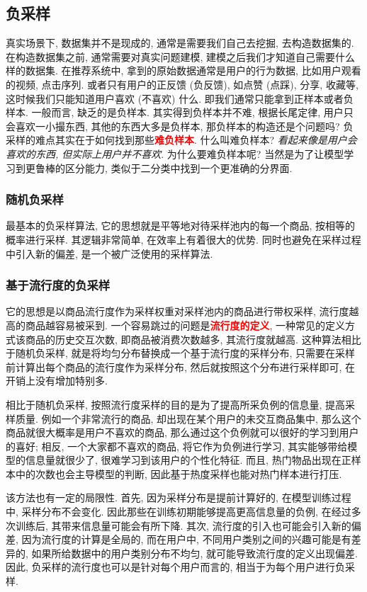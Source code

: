 \subsection{负采样}
真实场景下, 数据集并不是现成的, 通常是需要我们自己去挖掘, 去构造数据集的. 在构造数据集之前, 通常需要对真实问题建模, 建模之后我们才知道自己需要什么样的数据集. 在推荐系统中, 拿到的原始数据通常是用户的行为数据, 比如用户观看的视频, 点击序列. 或者只有用户的正反馈 (负反馈), 如点赞 (点踩), 分享, 收藏等, 这时候我们只能知道用户喜欢 (不喜欢) 什么. 即我们通常只能拿到正样本或者负样本. 一般而言, 缺乏的是负样本. 其实得到负样本并不难, 根据长尾定律, 用户只会喜欢一小撮东西, 其他的东西大多是负样本, 那负样本的构造还是个问题吗? 负采样的难点其实在于如何找到那些\textcolor{red}{\textbf{难负样本}}. 什么叫难负样本? \textit{看起来像是用户会喜欢的东西, 但实际上用户并不喜欢}. 为什么要难负样本呢? 当然是为了让模型学习到更鲁棒的区分能力, 类似于二分类中找到一个更准确的分界面.

\subsubsection{随机负采样}
最基本的负采样算法, 它的思想就是平等地对待采样池内的每一个商品, 按相等的概率进行采样. 其逻辑非常简单, 在效率上有着很大的优势. 同时也避免在采样过程中引入新的偏差, 是一个被广泛使用的采样算法. 

\subsubsection{基于流行度的负采样}
它的思想是以商品流行度作为采样权重对采样池内的商品进行带权采样, 流行度越高的商品越容易被采到. 一个容易跳过的问题是\textcolor{red}{\textbf{流行度的定义}}, 一种常见的定义方式该商品的历史交互次数, 即商品被消费次数越多, 其流行度就越高. 这种算法相比于随机负采样, 就是将均匀分布替换成一个基于流行度的采样分布, 只需要在采样前计算出每个商品的流行度作为采样分布, 然后就按照这个分布进行采样即可, 在开销上没有增加特别多.
 
相比于随机负采样, 按照流行度采样的目的是为了提高所采负例的信息量, 提高采样质量. 例如一个非常流行的商品, 却出现在某个用户的未交互商品集中, 那么这个商品就很大概率是用户不喜欢的商品, 那么通过这个负例就可以很好的学习到用户的喜好; 相反, 一个大家都不喜欢的商品, 将它作为负例进行学习, 其实能够带给模型的信息量就很少了, 很难学习到该用户的个性化特征. 而且, 热门物品出现在正样本中的次数也会主导模型的判断, 因此基于热度采样也能对热门样本进行打压.

该方法也有一定的局限性. 首先, 因为采样分布是提前计算好的, 在模型训练过程中, 采样分布不会变化. 因此那些在训练初期能够提高更高信息量的负例, 在经过多次训练后, 其带来信息量可能会有所下降. 其次, 流行度的引入也可能会引入新的偏差, 因为流行度的计算是全局的, 而在用户中, 不同用户类别之间的兴趣可能是有差异的, 如果所给数据中的用户类别分布不均匀, 就可能导致流行度的定义出现偏差. 因此, 负采样的流行度也可以是针对每个用户而言的, 相当于为每个用户进行负采样.


